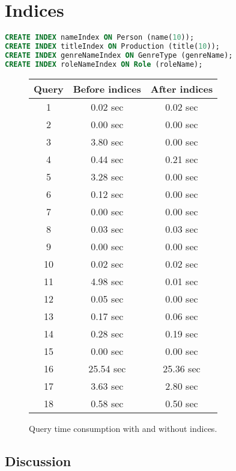 \lstset{
	basicstyle=\normalsize
}

\section{Indices}
\begin{lstlisting}[language=sql]
CREATE INDEX nameIndex ON Person (name(10));
CREATE INDEX titleIndex ON Production (title(10));
CREATE INDEX genreNameIndex ON GenreType (genreName);
CREATE INDEX roleNameIndex ON Role (roleName);
\end{lstlisting}

\begin{figure}[ht]
	\centering
	\begin{tabular}{c|c|c}
		Query & Before indices & After indices\\
		\hline
		1 & 0.02 sec & 0.02 sec\\
		2 & 0.00 sec & 0.00 sec\\
		3 & 3.80 sec & 0.00 sec\\
		4 & 0.44 sec & 0.21 sec\\
		5 & 3.28 sec & 0.00 sec\\
		6 & 0.12 sec & 0.00 sec\\
		7 & 0.00 sec & 0.00 sec\\
		8 & 0.03 sec & 0.03 sec\\
		9 & 0.00 sec & 0.00 sec\\
		10 & 0.02 sec & 0.02 sec\\
		11 & 4.98 sec & 0.01 sec\\
		12 & 0.05 sec & 0.00 sec\\
		13 & 0.17 sec & 0.06 sec\\
		14 & 0.28 sec & 0.19 sec\\
		15 & 0.00 sec & 0.00 sec\\
		16 & 25.54 sec & 25.36 sec\\
		17 & 3.63 sec & 2.80 sec\\
		18 & 0.58 sec & 0.50 sec
	\end{tabular}
	\caption{Query time consumption with and without indices.}
\end{figure}

\subsection{Discussion}
